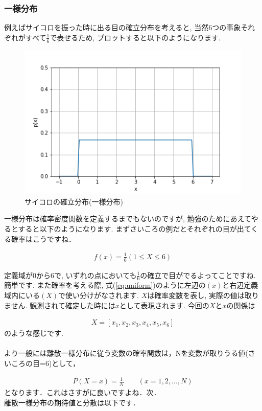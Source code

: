 \documentclass[11pt,a4paper]{jsarticle}                    %
\begin{document}
\subsubsection{一様分布}
例えばサイコロを振った時に出る目の確立分布を考えると, 当然6つの事象それぞれがすべて$\frac{1}{6}$で表せるため, プロットすると以下のようになります.\\
\begin{figure}[H]
\label{im:uniform}
  \centering
  \includegraphics[width=120mm,bb=0 0 432 288]{../figures/uniform.png}
  \caption{サイコロの確立分布(一様分布)}
\end{figure}

一様分布は確率密度関数を定義するまでもないのですが, 勉強のためにあえてやるとすると以下のようになります. まずさいころの例だとそれぞれの目が出てくる確率はこうですね．

\begin{eqnarray}
\label{eq:uniform}
f(x) = \frac{1}{6} (1 \leq X \leq 6)
\end{eqnarray}

定義域が0から6で, いずれの点においても$\frac{1}{6}$の確立で目がでるよってことですね. 簡単です. また確率を考える際, 式(\ref{eq:uniform})のように左辺の$(x)$と右辺定義域内にいる$(X)$で使い分けがなされます. $X$は確率変数を表し, 実際の値は取りません. 観測されて確定した時には$x$として表現されます. 今回の$X$と$x$の関係は

\begin{eqnarray}
X = [x_1, x_2, x_3, x_4, x_5, x_6]
\end{eqnarray}
のような感じです. \\
\\
より一般には離散一様分布に従う変数の確率関数は，Nを変数が取りうる値(さいころの目=6)として，

\begin{eqnarray}
P(X=x) = \frac{1}{N} \qquad (x=1,2,...,N)
\end{eqnarray}
となります．これはさすがに良いですよね．次．\\
離散一様分布の期待値と分散は以下です．\\
\end{document}
